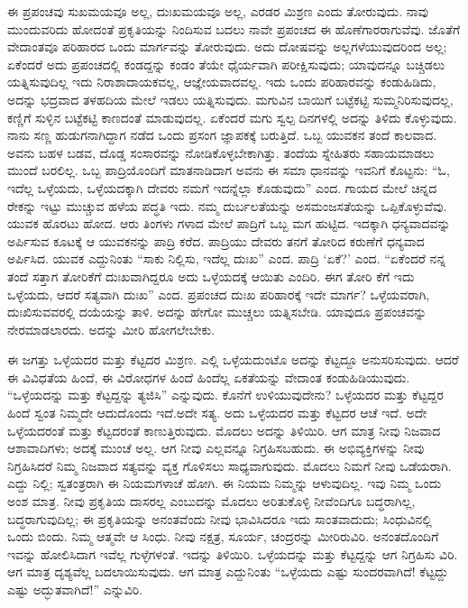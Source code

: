 ಈ ಪ್ರಪಂಚವು ಸುಖಮಯವೂ ಅಲ್ಲ, ದುಃಖಮಯವೂ ಅಲ್ಲ, ಎರಡರ ಮಿಶ್ರಣ ಎಂದು ತೋರುವುದು. ನಾವು ಮುಂದುವರಿದು ಹೋದಂತೆ ಪ್ರಕೃತಿಯನ್ನು ನಿಂದಿಸುವ ಬದಲು ನಾವೇ ಪ್ರಪಂಚದ ಈ ಹೊಣೆಗಾರರಾಗುವೆವು. ಜೊತೆಗೆ ವೇದಾಂತವೂ ಪರಿಹಾರದ ಒಂದು ಮಾರ್ಗವನ್ನು ತೋರುವುದು. ಅದು ದೋಷವನ್ನು ಅಲ್ಲಗಳೆಯುವುದರಿಂದ ಅಲ್ಲ; ಏಕೆಂದರೆ ಅದು ಪ್ರಪಂಚದಲ್ಲಿ ಕಂಡದ್ದನ್ನು ಕಂಡಂ ತೆಯೇ ಧೈರ್ಯವಾಗಿ ಪರೀಕ್ಷಿಸುವುದು; ಯಾವುದನ್ನೂ ಬಚ್ಚಿಡಲು ಯತ್ನಿಸುವುದಿಲ್ಲ ಇದು ನಿರಾಶಾದಾಯಕವಲ್ಲ, ಆಜ್ಞೇಯವಾದವಲ್ಲ. ಇದು ಒಂದು ಪರಿಹಾರವನ್ನು ಕಂಡುಹಿಡಿದು, ಅದನ್ನು ಭದ್ರವಾದ ತಳಹದಿಯ ಮೇಲೆ ಇಡಲು ಯತ್ನಿಸುವುದು. ಮಗುವಿನ ಬಾಯಿಗೆ ಬಟ್ಟೆಕಟ್ಟಿ ಸುಮ್ಮನಿರಿಸುವುದಲ್ಲ, ಕಣ್ಣಿಗೆ ಸುಳ್ಳಿನ ಬಟ್ಟೆಕಟ್ಟಿ ಕಾಣದಂತೆ ಮಾಡುವುದಲ್ಲ. ಏಕೆಂದರೆ ಮಗು ಸ್ವಲ್ಪ ದಿನಗಳಲ್ಲಿ ಅದನ್ನು ತಿಳಿದು ಕೊಳ್ಳುವುದು. ನಾನು ಸಣ್ಣ ಹುಡುಗನಾಗಿದ್ದಾಗ ನಡೆದ ಒಂದು ಪ್ರಸಂಗ ಜ್ಞಾಪಕಕ್ಕೆ ಬರುತ್ತಿದೆ. ಒಬ್ಬ ಯುವಕನ ತಂದೆ ಕಾಲವಾದ. ಅವನು ಬಹಳ ಬಡವ, ದೊಡ್ಡ ಸಂಸಾರವನ್ನು ನೋಡಿಕೊಳ್ಳಬೇಕಾಗಿತ್ತು. ತಂದೆಯ ಸ್ನೇಹಿತರು ಸಹಾಯಮಾಡಲು ಮುಂದೆ ಬರಲಿಲ್ಲ. ಒಬ್ಬ ಪಾದ್ರಿಯೊಂದಿಗೆ ಮಾತನಾಡಿದಾಗ ಅವನು ಈ ಸಮಾ ಧಾನವನ್ನು ಇವನಿಗೆ ಕೊಟ್ಟನು: “ಓ, ಇದೆಲ್ಲ ಒಳ್ಳೆಯದು, ಒಳ್ಳೆಯದಕ್ಕಾಗಿ ದೇವರು ನಮಗೆ ಇದನ್ನೆಲ್ಲಾ ಕೊಡುವುದು” ಎಂದ. ಗಾಯದ ಮೇಲೆ ಚಿನ್ನದ ರೇಕನ್ನು ಇಟ್ಟು ಮುಚ್ಚುವ ಹಳೆಯ ಪದ್ಧತಿ ಇದು. ನಮ್ಮ ದುರ್ಬಲತೆಯನ್ನು ಅಸಮಂಜಸತೆಯನ್ನು ಒಪ್ಪಿಕೊಳ್ಳುವೆವು. ಯುವಕ ಹೊರಟು ಹೋದ. ಆರು ತಿಂಗಳು ಗಳಾದ ಮೇಲೆ ಪಾದ್ರಿಗೆ ಒಬ್ಬ ಮಗ ಹುಟ್ಟಿದ. ಇದಕ್ಕಾಗಿ ಧನ್ಯವಾದವನ್ನು ಅರ್ಪಿಸುವ ಕೂಟಕ್ಕೆ ಆ ಯುವಕನನ್ನು ಪಾದ್ರಿ ಕರೆದ. ಪಾದ್ರಿಯು ದೇವರು ತನಗೆ ತೋರಿದ ಕರುಣೆಗೆ ಧನ್ಯವಾದ ಅರ್ಪಿಸಿದ. ಯುವಕ ಎದ್ದುನಿಂತು “ಸಾಕು ನಿಲ್ಲಿಸು, ಇದೆಲ್ಲ ದುಃಖ” ಎಂದ. ಪಾದ್ರಿ ‘ಏಕೆ?’ ಎಂದ. “ಏಕೆಂದರೆ ನನ್ನ ತಂದೆ ಸತ್ತಾಗ ತೋರಿಕೆಗೆ ದುಃಖವಾಗಿದ್ದರೂ ಅದು ಒಳ್ಳೆಯದಕ್ಕೆ ಆಯಿತು ಎಂದಿರಿ. ಈಗ ತೋರಿ ಕೆಗೆ ಇದು ಒಳ್ಳೆಯದು, ಆದರೆ ಸತ್ಯವಾಗಿ ದುಃಖ” ಎಂದ. ಪ್ರಪಂಚದ ದುಃಖ ಪರಿಹಾರಕ್ಕೆ ಇದೇ ಮಾರ್ಗ? ಒಳ್ಳೆಯವರಾಗಿ, ದುಃಖಿಸುವವರಲ್ಲಿ ದಯೆಯನ್ನು ತಾಳಿ. ಅದನ್ನು ಹೇಗೋ ಮುಚ್ಚಲು ಯತ್ನಿಸಬೇಡಿ. ಯಾವುದೂ ಪ್ರಪಂಚವನ್ನು ನೇರಮಾಡಲಾರದು. ಅದನ್ನು ಮೀರಿ ಹೋಗಲೇಬೇಕು.

ಈ ಜಗತ್ತು ಒಳ್ಳೆಯದರ ಮತ್ತು ಕೆಟ್ಟದರ ಮಿಶ್ರಣ. ಎಲ್ಲಿ ಒಳ್ಳೆಯದುಂಟೊ ಅದನ್ನು ಕೆಟ್ಟದ್ದೂ ಅನುಸರಿಸುವುದು. ಆದರೆ ಈ ವಿವಿಧತೆಯ ಹಿಂದೆ, ಈ ವಿರೋಧಗಳ ಹಿಂದೆ ಹಿಂದೆಲ್ಲ ಏಕತೆಯನ್ನು ವೇದಾಂತ ಕಂಡುಹಿಡಿಯುವುದು. “ಒಳ್ಳೆಯದನ್ನು ಮತ್ತು ಕೆಟ್ಟದ್ದನ್ನು ತ್ಯಜಿಸಿ” ಎನ್ನುವುದು. ಕೊನೆಗೆ ಉಳಿಯುವುದೇನು? ಒಳ್ಳೆಯದರ ಮತ್ತು ಕೆಟ್ಟದ್ದರ ಹಿಂದೆ ಸ್ವಂತ ನಿಮ್ಮದೇ ಆದುದೊಂದು ಇದೆ.ಅದೇ ಸತ್ಯ. ಅದು ಒಳ್ಳೆಯದರ ಮತ್ತು ಕೆಟ್ಟದರ ಆಚೆ ಇದೆ. ಅದೇ ಒಳ್ಳೆಯದರಂತೆ ಮತ್ತು ಕೆಟ್ಟದರಂತೆ ಕಾಣುತ್ತಿರುವುದು. ಮೊದಲು ಅದನ್ನು ತಿಳಿಯಿರಿ. ಆಗ ಮಾತ್ರ ನೀವು ನಿಜವಾದ ಆಶಾವಾದಿಗಳು; ಅದಕ್ಕೆ ಮುಂಚೆ ಅಲ್ಲ. ಆಗ ನೀವು ಎಲ್ಲವನ್ನೂ ನಿಗ್ರಹಿಸಬಹುದು. ಈ ಅಭಿವ್ಯಕ್ತಿಗಳನ್ನು ನೀವು ನಿಗ್ರಹಿಸಿದರೆ ನಿಮ್ಮ ನಿಜವಾದ ಸತ್ಯವನ್ನು ವ್ಯಕ್ತ ಗೊಳಿಸಲು ಸಾಧ್ಯವಾಗುವುದು. ಮೊದಲು ನಿಮಗೆ ನೀವು ಒಡೆಯರಾಗಿ. ಎದ್ದು ನಿಲ್ಲಿ; ಸ್ವತಂತ್ರರಾಗಿ ಈ ನಿಯಮಗಳಾಚೆ ಹೋಗಿ. ಈ ನಿಯಮ ನಿಮ್ಮನ್ನು ಆಳುವುದಿಲ್ಲ. ಇವು ನಿಮ್ಮ ಒಂದು ಅಂಶ ಮಾತ್ರ. ನೀವು ಪ್ರಕೃತಿಯ ದಾಸರಲ್ಲ ಎಂಬುದನ್ನು ಮೊದಲು ಅರಿತುಕೊಳ್ಳಿ ನೀವೆಂದಿಗೂ ಬದ್ಧರಾಗಿಲ್ಲ, ಬದ್ಧರಾಗುವುದಿಲ್ಲ; ಈ ಪ್ರಕೃತಿಯನ್ನು ಅನಂತವೆಂದು ನೀವು ಭಾವಿಸಿದರೂ ಇದು ಸಾಂತವಾದುದು; ಸಿಂಧುವಿನಲ್ಲಿ ಒಂದು ಬಿಂದು. ನಿಮ್ಮ ಆತ್ಮವೇ ಆ ಸಿಂಧು. ನೀವು ನಕ್ಷತ್ರ, ಸೂರ್ಯ, ಚಂದ್ರರನ್ನು ಮೀರಿರುವಿರಿ. ಅನಂತದೊಂದಿಗೆ ಇವನ್ನು ಹೋಲಿಸಿದಾಗ ಇವೆಲ್ಲ ಗುಳ್ಳೆಗಳಂತೆ. ಇದನ್ನು ತಿಳಿಯಿರಿ. ಒಳ್ಳೆಯದನ್ನು ಮತ್ತು ಕೆಟ್ಟದ್ದನ್ನು ಆಗ ನಿಗ್ರಹಿಸು ವಿರಿ. ಆಗ ಮಾತ್ರ ದೃಶ್ಯವೆಲ್ಲ ಬದಲಾಯಿಸುವುದು. ಆಗ ಮಾತ್ರ ಎದ್ದುನಿಂತು “ಒಳ್ಳೆಯದು ಎಷ್ಟು ಸುಂದರವಾಗಿದೆ! ಕೆಟ್ಟದ್ದು ಎಷ್ಟು ಅದ್ಭುತವಾಗಿದೆ!” ಎನ್ನುವಿರಿ.

